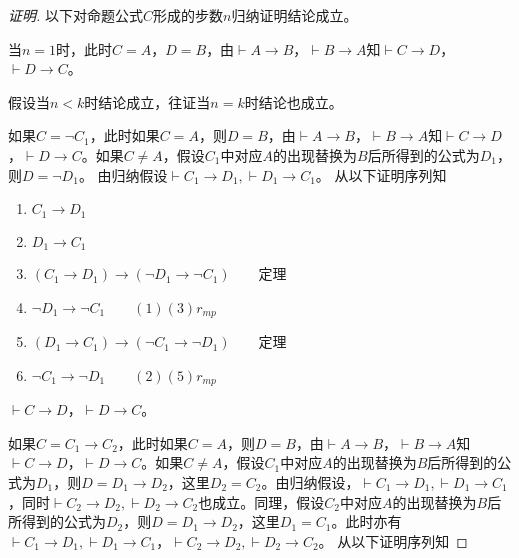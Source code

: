 \documentclass{article}
\begin{document}
\begin{CJK*}{UTF8}{gbsn}
\begin{proof}[证明]
    以下对命题公式$C$形成的步数$n$归纳证明结论成立。

    当$n=1$时，此时$C=A$，$D=B$，由$\vdash A\to B$，$\vdash B\to A$知$\vdash C\to D$，$\vdash D\to C$。

    假设当$n<k$时结论成立，往证当$n=k$时结论也成立。

    如果$C=\lnot C_1$，此时如果$C=A$，则$D=B$，由$\vdash A\to B$，$\vdash B\to A$知$\vdash C\to D$，$\vdash D\to C$。如果$C\neq A$，假设$C_1$中对应$A$的出现替换为$B$后所得到的公式为$D_1$，则$D=\lnot D_1$。
由归纳假设$\vdash C_1\to D_1, \vdash D_1\to C_1$。
从以下证明序列知
\begin{enumerate}
  \item $C_1\to D_1$
  \item $D_1\to C_1$
  \item $(C_1\to D_1) \to (\lnot D_1\to \lnot C_1)\qquad$定理
  \item $\lnot D_1\to \lnot C_1\qquad (1)(3)r_{mp}$
  \item $(D_1\to C_1) \to (\lnot C_1\to \lnot D_1)\qquad$定理
  \item $\lnot C_1\to \lnot D_1\qquad (2)(5)r_{mp}$
\end{enumerate}
$\vdash C\to D$，$\vdash D\to C$。

如果$C=C_1\to C_2$，此时如果$C=A$，则$D=B$，由$\vdash A\to B$，$\vdash B\to A$知$\vdash C\to D$，$\vdash D\to C$。如果$C\neq A$，假设$C_1$中对应$A$的出现替换为$B$后所得到的公式为$D_1$，则$D=D_1\to D_2$，这里$D_2=C_2$。由归纳假设，$\vdash C_1\to D_1, \vdash D_1\to C_1$，同时$\vdash C_2\to D_2, \vdash D_2\to C_2$也成立。同理，假设$C_2$中对应$A$的出现替换为$B$后所得到的公式为$D_2$，则$D=D_1\to D_2$，这里$D_1=C_1$。此时亦有$\vdash C_1\to D_1, \vdash D_1\to C_1$，$\vdash C_2\to D_2, \vdash D_2\to C_2$。
从以下证明序列知


\end{proof}
\end{CJK*}
\end{document}
